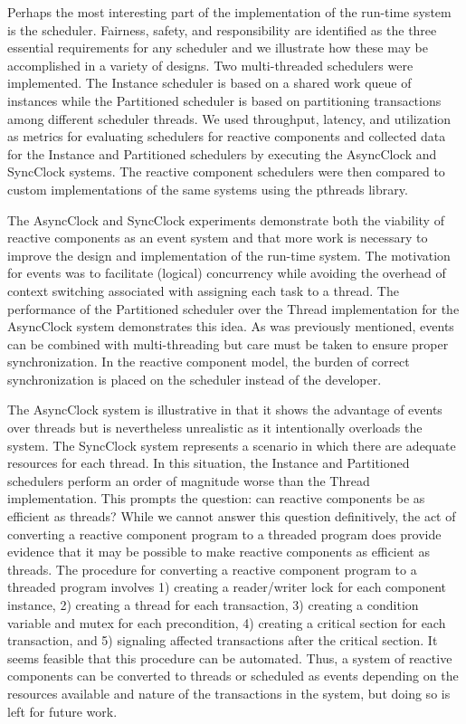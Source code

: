 Perhaps the most interesting part of the implementation of the \rcgo{} run-time system is the scheduler.
Fairness, safety, and responsibility are identified as the three essential requirements for any scheduler and we illustrate how these may be accomplished in a variety of designs.
Two multi-threaded schedulers were implemented.
The Instance scheduler is based on a shared work queue of instances while the Partitioned scheduler is based on partitioning transactions among different scheduler threads.
We used throughput, latency, and utilization as metrics for evaluating schedulers for reactive components and collected data for the Instance and Partitioned schedulers by executing the AsyncClock and SyncClock systems.
The reactive component schedulers were then compared to custom implementations of the same systems using the pthreads library.

The AsyncClock and SyncClock experiments demonstrate both the viability of reactive components as an event system and that more work is necessary to improve the design and implementation of the run-time system.
The motivation for events was to facilitate (logical) concurrency while avoiding the overhead of context switching associated with assigning each task to a thread.
The performance of the Partitioned scheduler over the Thread implementation for the AsyncClock system demonstrates this idea.
As was previously mentioned, events can be combined with multi-threading but care must be taken to ensure proper synchronization.
In the reactive component model, the burden of correct synchronization is placed on the scheduler instead of the developer.

The AsyncClock system is illustrative in that it shows the advantage of events over threads but is nevertheless unrealistic as it intentionally overloads the system.
The SyncClock system represents a scenario in which there are adequate resources for each thread.
In this situation, the Instance and Partitioned schedulers perform an order of magnitude worse than the Thread implementation.
This prompts the question:  can reactive components be as efficient as threads?
While we cannot answer this question definitively, the act of converting a reactive component program to a threaded program does provide evidence that it may be possible to make reactive components as efficient as threads.
The procedure for converting a reactive component program to a threaded program involves 1) creating a reader/writer lock for each component instance, 2) creating a thread for each transaction, 3) creating a condition variable and mutex for each precondition, 4) creating a critical section for each transaction, and 5) signaling affected transactions after the critical section.
It seems feasible that this procedure can be automated.
Thus, a system of reactive components can be converted to threads or scheduled as events depending on the resources available and nature of the transactions in the system, but doing so is left for future work.

